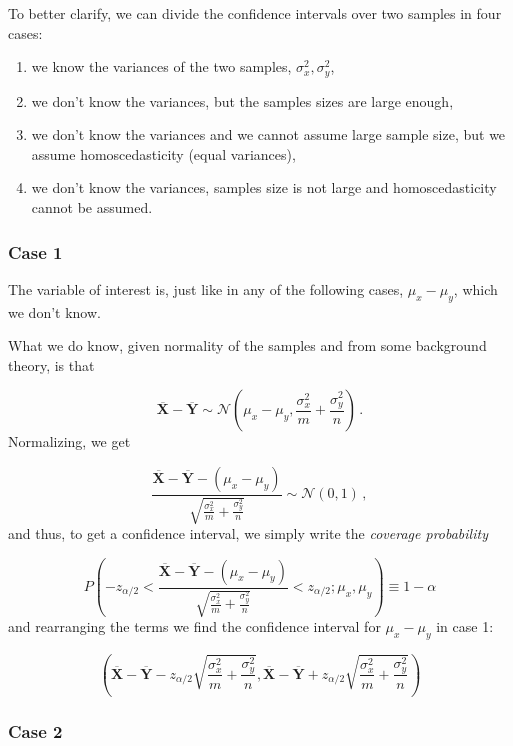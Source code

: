 \documentclass[
  oneside]{book}
\providecommand{\tightlist}{%
  \setlength{\itemsep}{0pt}\setlength{\parskip}{0pt}}
\begin{document}
To better clarify, we can divide the confidence intervals over
two samples in four cases:

\begin{enumerate}
\def\labelenumi{\arabic{enumi}.}
\tightlist
\item
  we know the variances of the two samples, \(\sigma_x^2, \sigma_y^2\),
\item
  we don't know the variances, but the samples sizes are large enough,
\item
  we don't know the variances and we cannot assume large sample size, but we
  assume homoscedasticity (equal variances),
\item
  we don't know the variances, samples size is not large and homoscedasticity
  cannot be assumed.
\end{enumerate}

\hypertarget{case-1}{%
\subsubsection{Case 1}\label{case-1}}

The variable of interest is, just like in any of the following cases,
\(\mu_x - \mu_y\), which we don't know.

What we do know, given normality of the samples and from some background theory,
is that

\[
\overline{\mathbf X} - \overline{\mathbf Y}\sim \mathcal N(\mu_x - 
\mu_y, \frac{\sigma_x^2}{m} + \frac{\sigma_y^2}{n})\,.
\]
Normalizing, we get

\[
\frac{\overline{\mathbf X} - \overline{\mathbf Y} - (\mu_x -
\mu_y)}{\sqrt{\frac{\sigma_x^2}{m} +
\frac{\sigma_y^2}{n}}}\sim \mathcal N(0, 1)\,,
\]
and thus, to get a confidence interval, we simply write the
\emph{coverage probability}

\[
P(- z_{\alpha/2} < \frac{\overline{\mathbf X} - \overline{\mathbf Y} - (\mu_x -
\mu_y)}{\sqrt{\frac{\sigma_x^2}{m} +
\frac{\sigma_y^2}{n}}} < z_{\alpha/2} ; \mu_x, \mu_y) \equiv 1 - \alpha
\]
and rearranging the terms we find the confidence interval for \(\mu_x - \mu_y\)
in case 1:

\[
\left( \overline{\mathbf X} - \overline{\mathbf Y} - z_{\alpha/2}
\sqrt{\frac{\sigma_x^2}{m} +
\frac{\sigma_y^2}{n}},  \overline{\mathbf X} - \overline{\mathbf Y} + z_{\alpha/2}
\sqrt{\frac{\sigma_x^2}{m} +
\frac{\sigma_y^2}{n}}\right)
\]

\hypertarget{case-2}{%
\subsubsection{Case 2}\label{case-2}}
\end{document}
